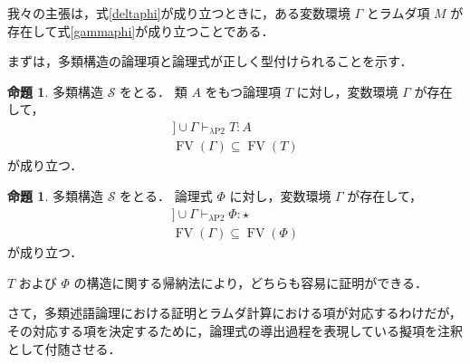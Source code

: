\documentclass[./main]{subfiles}
\newcommand{\lam}{\lambda}
\newcommand{\ocl}{\mathord{:}}
\newcommand{\op}[1]{\mathop{\mathrm{#1}}\nolimits}
\newcommand{\typstar}{\mathord{\star}}
\newcommand{\mathscr}[1]{\mathcal{#1}}
\newcommand{\llbracket}{[\![}
\newcommand{\rrbracket}{]\!]}
\theoremstyle{definition}
\newtheorem{prop}[theo]{命題}
\begin{document}
我々の主張は，式\ref{deltaphi}が成り立つときに，ある変数環境 $ \varGamma $ とラムダ項 $ M $ が存在して式\ref{gammaphi}が成り立つことである．


まずは，多類構造の論理項と論理式が正しく型付けられることを示す．

\begin{prop}
多類構造 $ \mathscr{S} $ をとる．
類 $ A $ をもつ論理項 $ T $ に対し，変数環境 $ \varGamma $ が存在して，
\begin{gather*}
\llbracket \mathscr{S} \rrbracket \cup \varGamma \vdash _{\lam \mathrm{P2}} T \ocl\, A \\
\op{FV} (\varGamma) \subseteq \op{FV} (T)
\end{gather*}
が成り立つ．
\end{prop}

\begin{prop} 
多類構造 $ \mathscr{S} $ をとる．
論理式 $ \varPhi $ に対し，変数環境 $ \varGamma $ が存在して，
\begin{gather*}
\llbracket \mathscr{S} \rrbracket \cup \varGamma \vdash _{\lam \mathrm{P2}} \varPhi \ocl\, \typstar \\
\op{FV} (\varGamma) \subseteq \op{FV} (\varPhi)
\end{gather*}
が成り立つ．
\end{prop}

$ T $ および $ \varPhi $ の構造に関する帰納法により，どちらも容易に証明ができる．

さて，多類述語論理における証明とラムダ計算における項が対応するわけだが，その対応する項を決定するために，論理式の導出過程を表現している擬項を注釈として付随させる．
\end{document}
